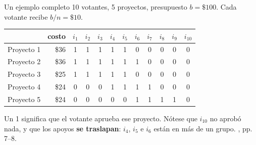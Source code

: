\documentclass[11pt, aspectratio=169]{beamer}
\newcommand{\budget}{b}                 %
\begin{document}
\begin{frame}{Un ejemplo completo}
  10 votantes, 5 proyectos, presupuesto $\budget=\$100$. Cada votante recibe
  $\budget/n = \$10$.

  \vspace{0.6em}
  \centering
  \small
  \begin{tabular}{lrcccccccccc}
    \toprule
     & costo & $i_1$ & $i_2$ & $i_3$ & $i_4$ & $i_5$ & $i_6$ & $i_7$ & $i_8$ & $i_9$ & $i_{10}$\\
    \midrule
    Proyecto 1 & \$36 & 1&1&1&1&1&0&0&0&0&0\\
    Proyecto 2 & \$36 & 1&1&1&1&1&1&0&0&0&0\\
    Proyecto 3 & \$25 & 1&1&1&1&1&0&0&0&0&0\\
    Proyecto 4 & \$24 & 0&0&0&1&1&1&1&0&0&0\\
    Proyecto 5 & \$24 & 0&0&0&0&0&1&1&1&1&0\\
    \bottomrule
  \end{tabular}

  \vspace{0.6em}
  \raggedright
  {\small Un 1 significa que el votante aprueba ese proyecto. Nótese que
  $i_{10}$ no aprobó nada, y que los apoyos \textbf{se traslapan}: $i_4$, $i_5$
  e $i_6$ están en más de un grupo. \hfill {\tiny \citet{peters2021}, pp. 7--8.}}
\end{frame}
\end{document}
